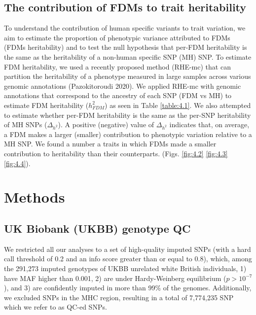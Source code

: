 \subsection{The contribution of FDMs to trait heritability}
To understand the contribution of human specific  variants to trait variation, we aim to estimate the proportion of phenotypic variance attributed to FDMs (FDMs heritability) and to test the null hypothesis that per-FDM heritability is the same as the heritability of a non-human specific SNP (MH) SNP. 
To estimate FDM heritability, we used a recently proposed method (RHE-mc) that can partition the heritability of a phenotype measured in large samples across various genomic annotations (Pazokitoroudi 2020). We applied RHE-mc with genomic annotations that correspond to the ancestry of each SNP (FDM vs MH) to estimate FDM heritability ($h^2_{FDM}$) as seen in Table \ref{table:4.1}. We also attempted to estimate whether per-FDM heritability is the same as the per-SNP heritability of MH SNPs ($\Delta_{h^2}$). A positive (negative) value of $\Delta_{h^2}$ indicates that, on average, a FDM makes a larger (smaller) contribution to phenotypic variation relative to a MH SNP. We found a number a traits in which FDMs made a smaller contribution to heritability than their counterparts. (Figs. \ref{fig:4.2} \ref{fig:4.3} \ref{fig:4.4}).
\section{Methods}
\subsection{UK Biobank (UKBB) genotype QC}
We restricted all our analyses to a set of high-quality imputed SNPs (with a hard call threshold of 0.2 and an info score greater than or equal to 0.8), which, among the 291,273 imputed genotypes of UKBB unrelated white British individuals, 1) have MAF higher than 0.001, 2) are under Hardy-Weinberg equilibrium ($p > 10^{-7}$), and 3) are confidently imputed in more than 99\% of the genomes. Additionally, we excluded SNPs in the MHC region, resulting in a total of 7,774,235 SNP which we refer to as QC-ed SNPs.

